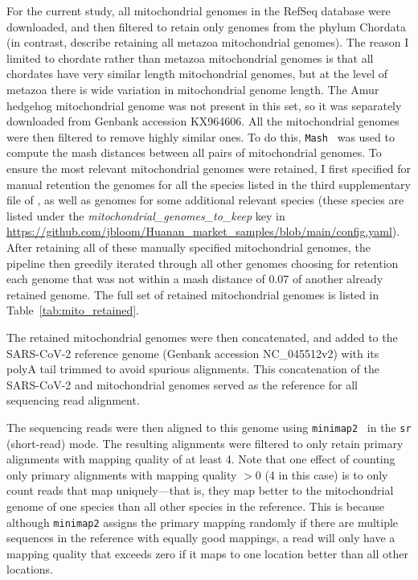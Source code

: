 \documentclass[9pt,twocolumn,twoside]{gsajnl_modified}
\begin{document}
{For the current study, all mitochondrial genomes in the RefSeq database were downloaded, and then filtered to retain only genomes from the phylum Chordata (in contrast, \citet{crits2023genetic} describe retaining all metazoa mitochondrial genomes).
The reason I limited to chordate rather than metazoa mitochondrial genomes is that all chordates have very similar length mitochondrial genomes, but at the level of metazoa there is wide variation in mitochondrial genome length.
The Amur hedgehog mitochondrial genome was not present in this set, so it was separately downloaded from Genbank accession KX964606.
All the mitochondrial genomes were then filtered to remove highly similar ones.
To do this, \texttt{Mash}~\citep{ondov2016mash} was used to compute the mash distances between all pairs of mitochondrial genomes.
To ensure the most relevant mitochondrial genomes were retained, I first specified for manual retention the genomes for all the species listed in the third supplementary file of \citet{crits2023genetic}, as well as genomes for some additional relevant species (these species are listed under the \textit{mitochondrial\_genomes\_to\_keep} key in \url{https://github.com/jbloom/Huanan_market_samples/blob/main/config.yaml}).
After retaining all of these manually specified mitochondrial genomes, the pipeline then greedily iterated through all other genomes choosing for retention each genome that was not within a mash distance of 0.07 of another already retained genome.
The full set of retained mitochondrial genomes is listed in Table~\ref{tab:mito_retained}.

The retained mitochondrial genomes were then concatenated, and added to the SARS-CoV-2 reference genome (Genbank accession NC\_045512v2) with its polyA tail trimmed to avoid spurious alignments.
This concatenation of the SARS-CoV-2 and mitochondrial genomes served as the reference for all sequencing read alignment.

The sequencing reads were then aligned to this genome using \texttt{minimap2}~\citep{li2018minimap2} in the \texttt{sr} (short-read) mode.
The resulting alignments were filtered to only retain primary alignments with mapping quality of at least 4.
Note that one effect of counting only primary alignments with mapping quality $>$0 (4 in this case) is to only count reads that map uniquely---that is, they map better to the mitochondrial genome of one species than all other species in the reference.
This is because although \texttt{minimap2} assigns the primary mapping randomly  if there are multiple sequences in the reference with equally good mappings, a read will only have a mapping quality that exceeds zero if it maps to one location better than all other locations.

}
\end{document}
